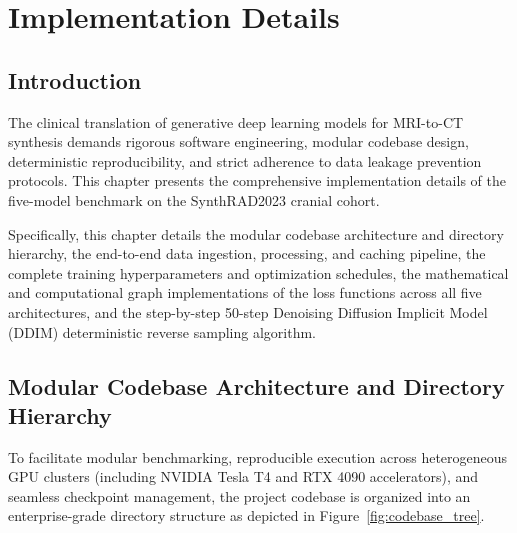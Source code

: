 \chapter{Implementation Details}

\section{Introduction}
The clinical translation of generative deep learning models for MRI-to-CT synthesis demands rigorous software engineering, modular codebase design, deterministic reproducibility, and strict adherence to data leakage prevention protocols. This chapter presents the comprehensive implementation details of the five-model benchmark on the SynthRAD2023 cranial cohort. 

Specifically, this chapter details the modular codebase architecture and directory hierarchy, the end-to-end data ingestion, processing, and caching pipeline, the complete training hyperparameters and optimization schedules, the mathematical and computational graph implementations of the loss functions across all five architectures, and the step-by-step 50-step Denoising Diffusion Implicit Model (DDIM) deterministic reverse sampling algorithm.

\section{Modular Codebase Architecture and Directory Hierarchy}
To facilitate modular benchmarking, reproducible execution across heterogeneous GPU clusters (including NVIDIA Tesla T4 and RTX 4090 accelerators), and seamless checkpoint management, the project codebase is organized into an enterprise-grade directory structure as depicted in Figure~\ref{fig:codebase_tree}.

